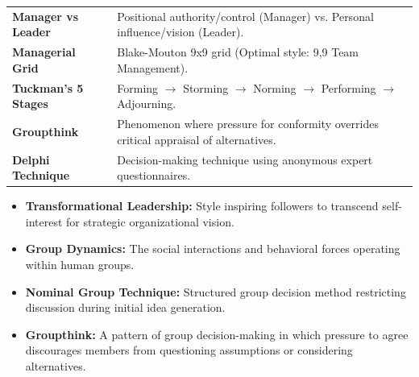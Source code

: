 \documentclass[12pt,a4paper]{article}
\renewcommand{\arraystretch}{1.45}
\begin{document}
\begin{tcolorbox}[formulabox, title={\textbf{Key Concepts and Metrics at a Glance}}]
\renewcommand{\arraystretch}{1.35}
\begin{tabularx}{\linewidth}{>{\raggedright\arraybackslash\bfseries}p{4.5cm} X}
Manager vs Leader & Positional authority/control (Manager) vs. Personal influence/vision (Leader). \\[4pt]
Managerial Grid & Blake-Mouton 9x9 grid (Optimal style: 9,9 Team Management). \\[4pt]
Tuckman's 5 Stages & Forming $\to$ Storming $\to$ Norming $\to$ Performing $\to$ Adjourning. \\[4pt]
Groupthink & Phenomenon where pressure for conformity overrides critical appraisal of alternatives. \\[4pt]
Delphi Technique & Decision-making technique using anonymous expert questionnaires. \\
\end{tabularx}
\end{tcolorbox}

\begin{tcolorbox}[defbox, title={\textbf{One-Line Definitions for Exam Revision}}]
  \begin{itemize}[leftmargin=*, itemsep=2pt]
    \item \textbf{Transformational Leadership:} Style inspiring followers to transcend self-interest for strategic organizational vision.
    \item \textbf{Group Dynamics:} The social interactions and behavioral forces operating within human groups.
    \item \textbf{Nominal Group Technique:} Structured group decision method restricting discussion during initial idea generation.
    \item \textbf{Groupthink:} A pattern of group decision-making in which pressure to agree discourages members from questioning assumptions or considering alternatives.
  \end{itemize}
\end{tcolorbox}
\end{document}
